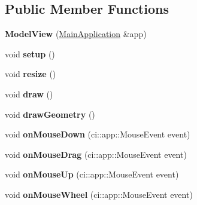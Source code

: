 \subsection*{Public Member Functions}
\begin{DoxyCompactItemize}
\item 
\mbox{\label{classpepr3d_1_1_model_view_a599453dcbeead48f23193e0305f24e75}} 
{\bfseries Model\+View} (\mbox{\hyperlink{classpepr3d_1_1_main_application}{Main\+Application}} \&app)
\item 
\mbox{\label{classpepr3d_1_1_model_view_a76ad73738050d3aabb681b53e5ea8398}} 
void {\bfseries setup} ()
\item 
\mbox{\label{classpepr3d_1_1_model_view_ab25e5abfcab1d8869e2ef78b44c98721}} 
void {\bfseries resize} ()
\item 
\mbox{\label{classpepr3d_1_1_model_view_a3336add9f3f59fb474713d4552590a5c}} 
void {\bfseries draw} ()
\item 
\mbox{\label{classpepr3d_1_1_model_view_ab428e44311e1ada48f4224f1cfd32915}} 
void {\bfseries draw\+Geometry} ()
\item 
\mbox{\label{classpepr3d_1_1_model_view_aa8dcae17a2801bbc3f6f26d919f12224}} 
void {\bfseries on\+Mouse\+Down} (ci\+::app\+::\+Mouse\+Event event)
\item 
\mbox{\label{classpepr3d_1_1_model_view_a661a9c2b434be28bee4b2f30052031f2}} 
void {\bfseries on\+Mouse\+Drag} (ci\+::app\+::\+Mouse\+Event event)
\item 
\mbox{\label{classpepr3d_1_1_model_view_a872e02f519f6737a69b427271f6e6c96}} 
void {\bfseries on\+Mouse\+Up} (ci\+::app\+::\+Mouse\+Event event)
\item 
\mbox{\label{classpepr3d_1_1_model_view_a90934c651648861138d6d754be15c140}} 
void {\bfseries on\+Mouse\+Wheel} (ci\+::app\+::\+Mouse\+Event event)
\item 
\mbox{\label{classpepr3d_1_1_model_view_a7223e1c00bbf6401b11b55d49bed71c5}} 

\end{DoxyCompactItemize}

